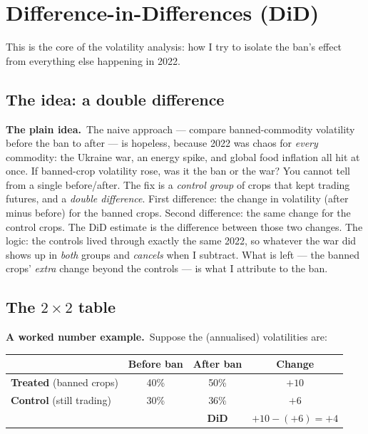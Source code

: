 \documentclass[11pt]{article}
\newcommand{\intuit}{\smallskip\noindent\textbf{The plain idea.}\ }
\newcommand{\example}{\smallskip\noindent\textbf{A worked number example.}\ }
\begin{document}
\section{Difference-in-Differences (DiD)}

This is the core of the volatility analysis: how I try to isolate the ban's effect from
everything else happening in 2022.

\subsection{The idea: a double difference}

\intuit The naive approach --- compare banned-commodity volatility before the ban to after --- is
hopeless, because 2022 was chaos for \emph{every} commodity: the Ukraine war, an energy spike, and
global food inflation all hit at once. If banned-crop volatility rose, was it the ban or the war?
You cannot tell from a single before/after. The fix is a \emph{control group} of crops that kept
trading futures, and a \emph{double difference}. First difference: the change in volatility (after
minus before) for the banned crops. Second difference: the same change for the control crops. The
DiD estimate is the difference between those two changes. The logic: the controls lived through
exactly the same 2022, so whatever the war did shows up in \emph{both} groups and \emph{cancels}
when I subtract. What is left --- the banned crops' \emph{extra} change beyond the controls --- is
what I attribute to the ban.

\subsection{The $2\times 2$ table}

\example Suppose the (annualised) volatilities are:

\begin{center}
\begin{tabular}{lccc}
\toprule
 & \textbf{Before ban} & \textbf{After ban} & \textbf{Change} \\
\midrule
\textbf{Treated} (banned crops) & 40\% & 50\% & $+10$ \\
\textbf{Control} (still trading) & 30\% & 36\% & $+6$ \\
\midrule
 & & \textbf{DiD} & $+10 - (+6) = +4$ \\
\bottomrule
\end{tabular}
\end{center}
\end{document}
